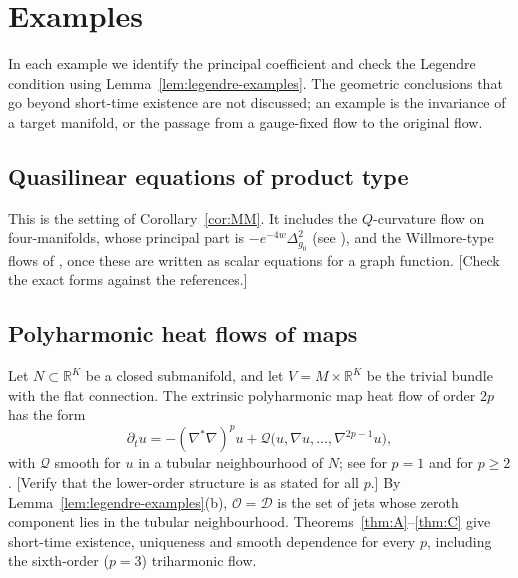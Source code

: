 \documentclass[11pt,reqno]{amsart}
\theoremstyle{definition}
\theoremstyle{remark}
\newcommand{\R}{\mathbb{R}}
\newcommand{\Dom}{\mathcal{D}}
\newcommand{\Par}{\mathcal{O}}
\newcommand{\Lap}{\nabla^{*}\nabla}
\newcommand{\todo}[1]{\textcolor{red!70!black}{[#1]}}
\numberwithin{equation}{section}
\begin{document}
\section{Examples}\label{sec:examples}

In each example we identify the principal coefficient and check the Legendre condition using
Lemma~\ref{lem:legendre-examples}. The geometric conclusions that go beyond short-time existence are
not discussed; an example is the invariance of a target manifold, or the passage from a gauge-fixed
flow to the original flow.

\subsection{Quasilinear equations of product type}
This is the setting of Corollary~\ref{cor:MM}. It includes the $Q$-curvature flow on four-manifolds,
whose principal part is $-e^{-4w}\Delta_{g_0}^2$ (see \cite{Brendle,MalchiodiStruwe}), and the
Willmore-type flows of \cite{KuwertSchaetzle,Polden}, once these are written as scalar equations for a
graph function. \todo{Check the exact forms against the references.}

\subsection{Polyharmonic heat flows of maps}
Let $N\subset\R^K$ be a closed submanifold, and let $V=M\times\R^K$ be the trivial bundle with the flat
connection. The extrinsic polyharmonic map heat flow of order $2p$ has the form
\[
  \partial_tu=-(\Lap)^pu+\mathcal Q\bigl(u,\nabla u,\dots,\nabla^{2p-1}u\bigr),
\]
with $\mathcal Q$ smooth for $u$ in a tubular neighbourhood of $N$; see \cite{EellsSampson} for $p=1$
and \cite{Lamm,Gastel} for $p\ge2$. \todo{Verify that the lower-order structure is as stated for all
$p$.} By Lemma~\ref{lem:legendre-examples}(b), $\Par=\Dom$ is the set of jets whose zeroth component
lies in the tubular neighbourhood. Theorems~\ref{thm:A}--\ref{thm:C} give short-time existence,
uniqueness and smooth dependence for every $p$, including the sixth-order ($p=3$) triharmonic flow.
\end{document}
